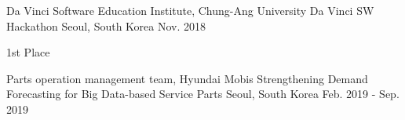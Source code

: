 \documentclass[11pt, a4paper]{awesome-cv} %
\begin{document}

\begin{cventries}
	\cventry
	{Da Vinci Software Education Institute, Chung-Ang University} %
	{Da Vinci SW Hackathon} %
	{Seoul, South Korea} %
	{Nov. 2018} %
	{
		\begin{cvitems}
			\item{1st Place}
		\end{cvitems}
	}
\end{cventries}



\begin{cventries}

	\cventry
	{Parts operation management team, Hyundai Mobis} %
	{Strengthening Demand Forecasting for Big Data-based Service Parts} %
	{Seoul, South Korea} %
	{Feb. 2019 - Sep. 2019} %
	{}

%	
\end{cventries}


\end{document}
